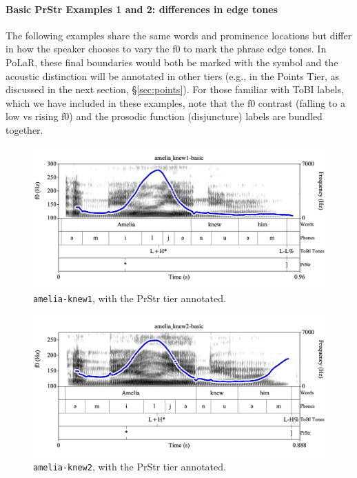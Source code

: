 \documentclass[11pt, twoside]{memoir}
\def\textlabel#1{{\relsize{-.5}\fontspec[Mapping=tex-text]{Roboto Mono}{#1}}}
\begin{document}
\paragraph{Basic PrStr Examples 1 and 2: differences in edge tones}
The following examples share the same words and prominence locations but differ in how the speaker chooses to vary the f0 to mark the phrase edge tones. In PoLaR, these final boundaries would both be marked with the \textlabel{]} symbol and the acoustic distinction will be annotated in other tiers (e.g., in the Points Tier, as discussed in the next section, §\ref{sec:points}). For those familiar with ToBI labels, which we have included in these examples, note that the f0 contrast (falling to a low vs rising f0) and the prosodic function (disjuncture) labels are bundled together. 
\begin{figure}[H]
\centering
\includegraphics[width=.875\linewidth]{PrStr-amelia_knew1-basic.png}
\caption{\texttt{amelia-knew1}, with the PrStr tier annotated.
\label{fig:amelia-knew1 PrStr}
}
\end{figure}
\begin{figure}[H]
\centering
\includegraphics[width=.875\linewidth]{PrStr-amelia_knew2-basic.png}
\caption{\texttt{amelia-knew2}, with the PrStr tier annotated.
\label{fig:amelia-knew2 PrStr}
}
\end{figure}
\end{document}
